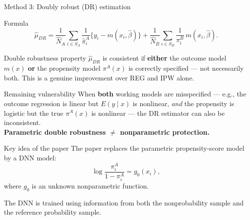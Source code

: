 \documentclass[aspectratio=169,11pt]{beamer}
\begin{document}
\begin{frame}{Method 3: Doubly robust (DR) estimation}
\begin{block}{Formula}
\[
\hat{\mu}_{DR}
=\frac{1}{\hat{N}_A}\sum_{i\in S_A}\frac{1}{\hat{\pi}_i^A}\{y_i-m(x_i,\hat{\beta})\}
+\frac{1}{\hat{N}_B}\sum_{i\in S_B}\frac{1}{\pi_i^B}\,m(x_i,\hat{\beta}).
\]
\end{block}
\vspace{0.05cm}
\begin{block}{Double robustness property}
$\hat{\mu}_{DR}$ is consistent if \textbf{either} the outcome model $m(x)$ \textbf{or} the propensity model $\pi^A(x)$ is correctly specified — not necessarily both. This is a genuine improvement over REG and IPW alone.
\end{block}
\vspace{0.1cm}
\begin{alertblock}{Remaining vulnerability}
When \textbf{both} working models are misspecified — e.g., the outcome regression is linear but $E(y\mid x)$ is nonlinear, \textit{and} the propensity is logistic but the true $\pi^A(x)$ is nonlinear — the DR estimator can also be inconsistent.\\
\textbf{Parametric double robustness $\neq$ nonparametric protection.}
\end{alertblock}
\end{frame}

\begin{frame}{Key idea of the paper}
The paper replaces the parametric propensity-score model by a DNN model:
\[
  \log\frac{\pi_i^A}{1-\pi_i^A}=g_0(x_i),
\]
where $g_0$ is an unknown nonparametric function.
\vspace{0.3cm}
\begin{center}
\end{center}
\vspace{0.2cm}
The DNN is trained using information from both the nonprobability sample and the reference probability sample.
\end{frame}
\end{document}
